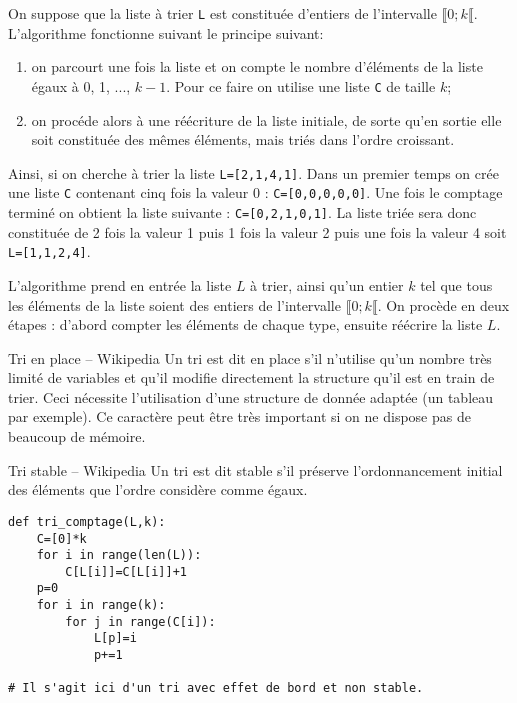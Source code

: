 
On suppose que la liste à trier \texttt{L} est constituée d’entiers de l’intervalle  $\llbracket 0; k \llbracket$. L’algorithme
fonctionne suivant le principe suivant: 
\begin{enumerate}
\item on parcourt une fois la liste et on compte le nombre d’éléments de
la liste égaux à 0, 1, ..., $k-1$. Pour ce faire on utilise une liste \texttt{C} de taille $k$;
\item on procéde alors à une réécriture de la liste initiale, de sorte qu’en sortie elle soit constituée des mêmes éléments, mais triés dans l’ordre
croissant.
\end{enumerate}

Ainsi, si on cherche à trier la liste \texttt{L=[2,1,4,1]}. Dans un premier temps on crée une liste \texttt{C} contenant cinq fois la valeur 0 : \texttt{C=[0,0,0,0,0]}. Une fois le comptage terminé on obtient la liste suivante : \texttt{C=[0,2,1,0,1]}. La liste triée sera donc constituée de 2 fois la valeur 1 puis 1 fois la valeur 2 puis une fois la valeur 4 soit \texttt{L=[1,1,2,4]}.



L’algorithme prend en entrée la liste $L$ à trier, ainsi qu’un entier $k$ tel que tous les éléments de la
liste soient des entiers de l’intervalle $\llbracket 0; k \llbracket$. On procède en deux étapes : d’abord compter les éléments de chaque type,
ensuite réécrire la liste $L$.



\begin{defi}{Tri en place -- Wikipedia}
Un tri est dit en place s'il n'utilise qu'un nombre très limité de variables et qu’il modifie directement la structure qu’il est en train de trier. Ceci nécessite l’utilisation d'une structure de donnée adaptée (un tableau par exemple). Ce caractère peut être très important si on ne dispose pas de beaucoup de mémoire.
\end{defi}

\begin{defi}{Tri stable  -- Wikipedia}
Un tri est dit stable s'il préserve l’ordonnancement initial des éléments que l'ordre considère comme égaux.
\end{defi}

\ifprof
\begin{lstlisting}
def tri_comptage(L,k):
    C=[0]*k
    for i in range(len(L)):
        C[L[i]]=C[L[i]]+1
    p=0
    for i in range(k):
        for j in range(C[i]):
            L[p]=i
            p+=1
            
# Il s'agit ici d'un tri avec effet de bord et non stable. 
\end{lstlisting}
\else
\fi